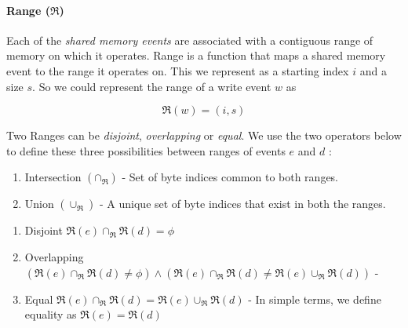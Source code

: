  
        
        \paragraph{Range ($\Re$)}
            Each of the \textit{shared memory events} are associated with a contiguous range of memory on which it operates. Range is a function that maps a shared memory event to the range it operates on. This we represent as a starting index $i$ and a size $s$. So we could represent the range of a write event $w$ as 
                    
                    \[\Re(w) = (i, s) \]
        
           
            Two Ranges can be \textit{disjoint}, \textit{overlapping} or \textit{equal}. We use the two operators below to define these three possibilities between ranges of events $e$ and $d$ :
            
            \begin{enumerate}
                \item Intersection $(\cap{_\Re})$ - Set of byte indices common to both ranges.
                \item Union $(\cup_\Re)$ - A unique set of byte indices that exist in both the ranges.  
            \end{enumerate}
            
            \begin{enumerate}
                \item Disjoint $\Re(e) \cap_\Re \Re(d) = \phi$ 
                \item Overlapping $(\Re(e)\cap_\Re \Re(d) \neq \phi) \wedge (\Re(e) \cap_\Re  \Re(d) \neq \Re(e) \cup_\Re \Re(d))$ - 
                \item Equal $\Re(e) \cap_\Re  \Re(d) = \Re(e) \cup_\Re \Re(d)$ - In simple terms, we define equality as $\Re(e) = \Re(d)$
            \end{enumerate}
            
